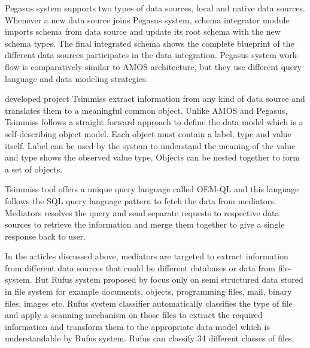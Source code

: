 	
	
	Pegasus system supports two types of data sources, local and native data sources. Whenever a new data source joins Pegasus system, schema integrator module imports schema from data source and update its root schema with the new schema types. The final integrated schema shows the complete blueprint of the different data sources participates in the data integration. Pegasus system work-flow is comparatively similar to AMOS architecture, but they use different query language and data modeling strategies.
	
	\citet{chawathe1994tsimmis} developed project Tsimmiss extract information from any kind of data source and translates them to a meaningful common object. Unlike AMOS and Pegasus, Tsimmiss follows a straight forward approach to define the data model which is a self-describing object model. Each object must contain a label, type and value itself. Label can be used by the system to understand the meaning of the value and type shows the observed value type. Objects can be nested together to form a set of objects. 
	
	Tsimmiss tool offers a unique query language called OEM-QL and this language follows the SQL query language pattern to fetch the data from mediators. Mediators resolves the query and send separate requests to respective data sources to retrieve the information and merge them together to give a single response back to user.
	
	In the articles discussed above, mediators are targeted to extract information from different data sources that could be different databases or data from file-system. But Rufus system proposed by \citet{shoens1993rufus} focus only on semi structured data stored in file system for example documents, objects, programming files, mail, binary files, images etc. Rufus system classifier automatically classifies the type of file and apply a scanning mechanism on those files to extract the required information and transform them to the appropriate data model which is understandable by Rufus system. Rufus can classify 34 different classes of files.
	

